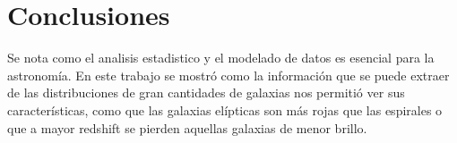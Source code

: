 \documentclass[twocolumn]{article}
\begin{document}
\section{Conclusiones}
Se nota como el analisis estadistico y el modelado de datos es esencial para la astronomía. En este trabajo se mostró como la información que se puede extraer de las distribuciones de gran cantidades de galaxias nos permitió ver sus características, como que las galaxias elípticas son más rojas que las espirales o que a mayor redshift se pierden aquellas galaxias de menor brillo. 



\end{document}
